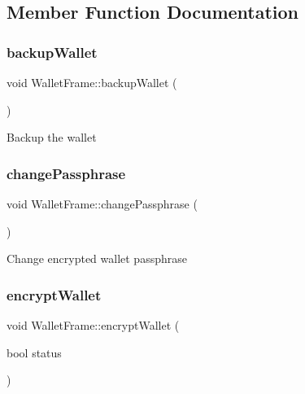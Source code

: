 \subsection{Member Function Documentation}
\mbox{\label{class_wallet_frame_a76aa3543635fedea052661a4cd44b81d}} 
\subsubsection{\texorpdfstring{backup\+Wallet}{backupWallet}}
{\footnotesize\ttfamily void Wallet\+Frame\+::backup\+Wallet (\begin{DoxyParamCaption}{ }\end{DoxyParamCaption})\hspace{0.3cm}{\ttfamily [slot]}}

Backup the wallet \mbox{\label{class_wallet_frame_a0a4026a734acdc0f5fbd5f775c167443}} 
\subsubsection{\texorpdfstring{change\+Passphrase}{changePassphrase}}
{\footnotesize\ttfamily void Wallet\+Frame\+::change\+Passphrase (\begin{DoxyParamCaption}{ }\end{DoxyParamCaption})\hspace{0.3cm}{\ttfamily [slot]}}

Change encrypted wallet passphrase \mbox{\label{class_wallet_frame_a8a9a419ba3e249f29fe321f2d789b761}} 
\subsubsection{\texorpdfstring{encrypt\+Wallet}{encryptWallet}}
{\footnotesize\ttfamily void Wallet\+Frame\+::encrypt\+Wallet (\begin{DoxyParamCaption}\item[{bool}]{status }\end{DoxyParamCaption})\hspace{0.3cm}{\ttfamily [slot]}}

